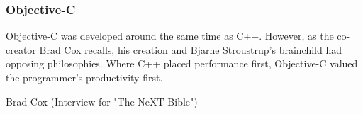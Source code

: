 \par
\vspace{-10pt}
\subsubsection{Objective-C}
Objective-C was developed around the same time as C++. However, as the co-creator Brad Cox recalls, his creation and Bjarne Stroustrup's brainchild had opposing philosophies. Where C++ placed performance first, Objective-C valued the programmer's productivity first.\\
\par
{} {Brad Cox (Interview for "The NeXT Bible")}\\
\par


